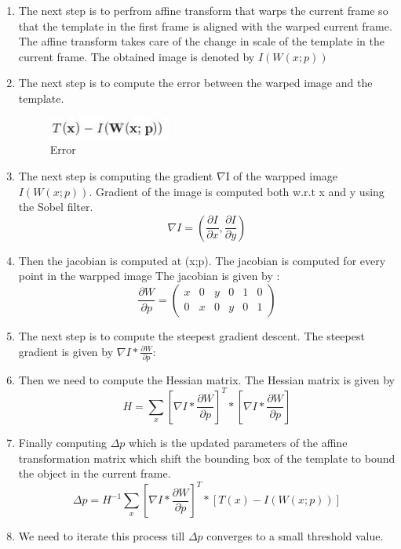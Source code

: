 \documentclass[12pt]{article}
\begin{document}
\begin{enumerate}
\item The next step is to perfrom affine transform that warps the current frame so that the template in the first frame is aligned with the warped current frame. The affine transform takes care of the change in scale of the template in the current frame. The obtained image is denoted by $I(W(x;p))$

\item The next step is to compute the error between the warped image and the template.

\begin{figure}[h]
    \centering
    \includegraphics[width=4cm]{error}
    \caption{Error}
    \label{fig: Error}
\end{figure}

\item The next step is computing the gradient $\nabla$I of the warpped image $I(W(x;p))$. Gradient of the image is computed both w.r.t x and y using the Sobel filter.
\begin{equation}
 \nabla I = \left(\frac{\partial I}{\partial x}, \frac{\partial I}{\partial y}\right)
\end{equation}
\item Then the jacobian is computed at (x;p). The jacobian is computed for every point in the warpped image The jacobian is given by :
\begin{equation}
\frac{\partial W}{\partial p} = 
\begin{pmatrix}
x & 0 & y & 0 & 1 & 0 \\
0 & x & 0 & y & 0 & 1
\end{pmatrix}
\end{equation}
\item The next step is to compute the steepest gradient descent. The steepest gradient is given by $\nabla I*\frac{\partial W}{\partial p}$:

\item Then we need to compute the Hessian matrix. The Hessian matrix is given by
\begin{equation}
H = \displaystyle\sum_{x}\left[\nabla I*\frac{\partial W}{\partial p}\right]^T*\left[\nabla I*\frac{\partial W}{\partial p}\right]
\end{equation}

\item Finally computing $\Delta p$ which is the updated parameters of the affine transformation matrix which shift the bounding box of the template to bound the object in the current frame.
\begin{equation}
\Delta p = H^{-1}\displaystyle\sum_{x}\left[\nabla I*\frac{\partial W}{\partial p}\right]^T*\left[T(x) - I(W(x;p))\right]
\end{equation}
 \item We need to iterate this process till $\Delta p$ converges to a small threshold value.
\end{enumerate}
\end{document}
